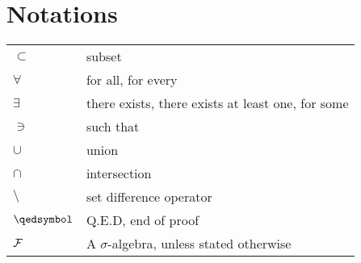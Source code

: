 \chapter*{Notations}

\begin{tabular}{ll}
$\subset $ & subset\\
$\forall$ & for all, for every\\
$\exists$ & there exists, there exists at least one, for some\\
$\ni$ & such that\\
$\cup$ & union\\
$\cap$ & intersection\\
$\setminus$ & set difference operator\\
$\qedsymbol$ & Q.E.D, end of proof\\
$\mathcal F$ & A $\sigma$-algebra, unless stated otherwise\\
\end{tabular}